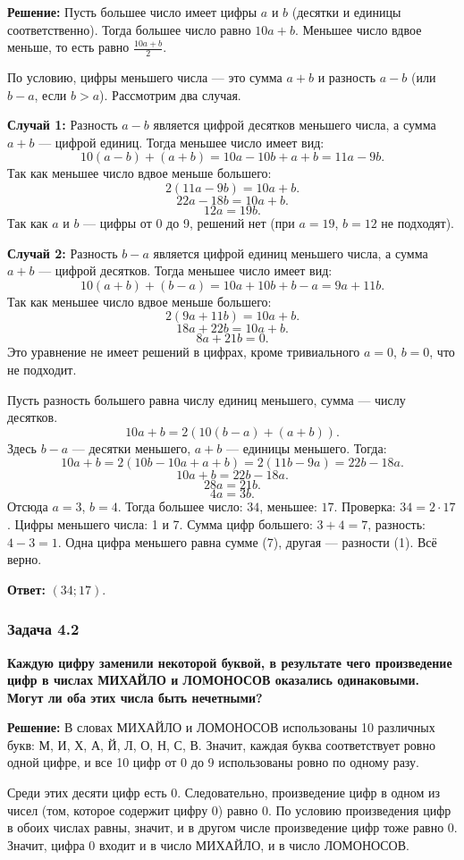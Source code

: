 \documentclass[12pt, a4paper]{article}
\begin{document}
\textbf{Решение:}
Пусть большее число имеет цифры $a$ и $b$ (десятки и единицы соответственно). Тогда большее число равно $10a + b$. Меньшее число вдвое меньше, то есть равно $\frac{10a + b}{2}$.

По условию, цифры меньшего числа — это сумма $a+b$ и разность $a-b$ (или $b-a$, если $b > a$). Рассмотрим два случая.

\textbf{Случай 1:} Разность $a-b$ является цифрой десятков меньшего числа, а сумма $a+b$ — цифрой единиц. Тогда меньшее число имеет вид:
\[
10(a-b) + (a+b) = 10a - 10b + a + b = 11a - 9b.
\]
Так как меньшее число вдвое меньше большего:
\[
2(11a - 9b) = 10a + b.
\]
\[
22a - 18b = 10a + b.
\]
\[
12a = 19b.
\]
Так как $a$ и $b$ — цифры от 0 до 9, решений нет (при $a=19$, $b=12$ не подходят).

\textbf{Случай 2:} Разность $b-a$ является цифрой единиц меньшего числа, а сумма $a+b$ — цифрой десятков. Тогда меньшее число имеет вид:
\[
10(a+b) + (b-a) = 10a + 10b + b - a = 9a + 11b.
\]
Так как меньшее число вдвое меньше большего:
\[
2(9a + 11b) = 10a + b.
\]
\[
18a + 22b = 10a + b.
\]
\[
8a + 21b = 0.
\]
Это уравнение не имеет решений в цифрах, кроме тривиального $a=0$, $b=0$, что не подходит.

Пусть разность большего равна числу единиц меньшего, сумма — числу десятков. 
\[
10a + b = 2(10(b-a) + (a+b)).
\]
Здесь $b-a$ — десятки меньшего, $a+b$ — единицы меньшего. Тогда:
\[
10a + b = 2(10b - 10a + a + b) = 2(11b - 9a) = 22b - 18a.
\]
\[
10a + b = 22b - 18a.
\]
\[
28a = 21b.
\]
\[
4a = 3b.
\]
Отсюда $a = 3$, $b = 4$. Тогда большее число: $34$, меньшее: $17$. Проверка: $34 = 2 \cdot 17$. Цифры меньшего числа: 1 и 7. Сумма цифр большего: $3+4=7$, разность: $4-3=1$. Одна цифра меньшего равна сумме (7), другая — разности (1). Всё верно.

\textbf{Ответ:} $(34; 17)$.

\subsubsection*{Задача 4.2}
\textbf{Каждую цифру заменили некоторой буквой, в результате чего произведение цифр в числах МИХАЙЛО и ЛОМОНОСОВ оказались одинаковыми. Могут ли оба этих числа быть нечетными?}

\textbf{Решение:}
В словах МИХАЙЛО и ЛОМОНОСОВ использованы 10 различных букв: М, И, Х, А, Й, Л, О, Н, С, В. Значит, каждая буква соответствует ровно одной цифре, и все 10 цифр от 0 до 9 использованы ровно по одному разу.

Среди этих десяти цифр есть 0. Следовательно, произведение цифр в одном из чисел (том, которое содержит цифру 0) равно 0. По условию произведения цифр в обоих числах равны, значит, и в другом числе произведение цифр тоже равно 0. Значит, цифра 0 входит и в число МИХАЙЛО, и в число ЛОМОНОСОВ.
\end{document}
